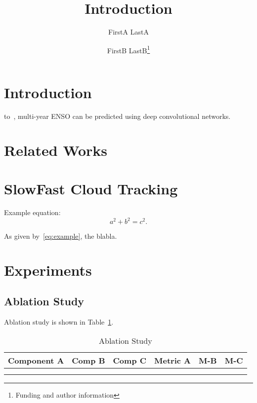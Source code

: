 \documentclass[compsoc]{IEEEtran}
\title{Introduction}
\author{FirstA LastA \and FirstB LastB\thanks{Funding and author information}}
\begin{document}

\maketitle

\section{Introduction}
\label{sec:introduction}

 to~\cite{ham_deep_2019}, multi-year ENSO can be predicted
using deep convolutional networks.

\section{Related Works}
\label{sec:related-works}

\section{SlowFast Cloud Tracking}
\label{sec:slowf-cloud-track}

Example equation:
\begin{equation}
  \label{eq:example}
  a^{2} + b^{2} = c^{2}.
\end{equation}

As given by~\eqref{eq:example}, the blabla. 

\section{Experiments}
\label{sec:experiments}

\subsection{Ablation Study}
\label{sec:ablation-study}

Ablation study is shown in Table~\ref{tab:ablation}.

\begin{table}[h]
  \centering
  \caption{Ablation Study}
  \label{tab:ablation}
  \begin{tabular}{ccc|ccc}
    \hline
    Component A & Comp B & Comp C & Metric A & M-B & M-C\\
    \hline
    & & & & & \\
    & & & & & \\
    \hline
  \end{tabular}
\end{table}
\end{document}
